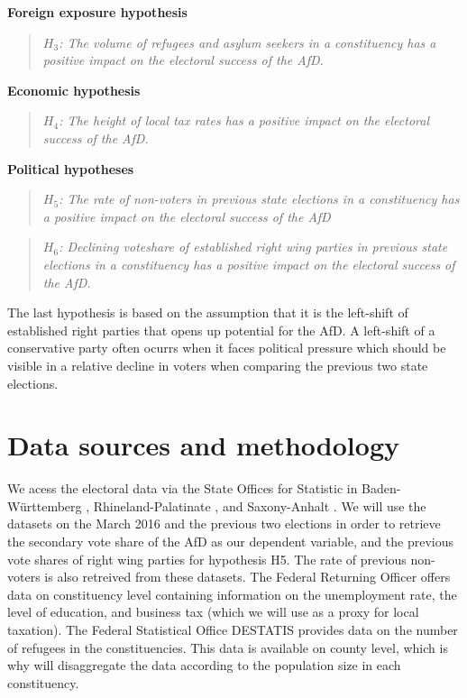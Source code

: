 \documentclass[12pt, hidelinks]{article}
\begin{document}
\textbf{Foreign exposure hypothesis}

\begin{quote}
    \textit{$H_{3}$: The volume of refugees and asylum seekers in a constituency has a positive impact on the electoral success of the AfD.}
\end{quote}


\textbf{Economic hypothesis}
\begin{quote}
    \textit{$H_{4}$: The height of local tax rates has a positive impact on the electoral success of the AfD.}
\end{quote}

\textbf{Political hypotheses}
\begin{quote}
    \textit{$H_{5}$: The rate of non-voters in previous state elections in a constituency has a positive impact on the electoral success of the AfD}
\end{quote}

\begin{quote}
    \textit{$H_{6}$: Declining voteshare of established right wing parties in previous state elections in a constituency has a positive impact on the electoral success of the AfD.}
\end{quote}


The last hypothesis is based on the assumption that it is the left-shift of established right parties that opens up potential for the AfD. A left-shift of a conservative party often ocurrs when it faces political pressure which should be visible in a relative decline in voters when comparing the previous two state elections.

\section{Data sources and methodology}

We acess the electoral data via the State Offices for Statistic in Baden-Württemberg \cite{BWStateOffice}, Rhineland-Palatinate \cite{RPStateOffice}, and Saxony-Anhalt \cite{SAStateOffice}. We will use the datasets on the March 2016 and the previous two elections in order to retrieve the secondary vote share of the AfD as our dependent variable, and the previous vote shares of right wing parties for hypothesis H5. The rate of previous non-voters is also retreived from these datasets.
The Federal Returning Officer \cite{Bwldata} offers data on constituency level containing information on the unemployment rate, the level of education, and business tax (which we will use as a proxy for local taxation).
The Federal Statistical Office DESTATIS \cite{DESTATIS} provides data on the number of refugees in the constituencies. This data is available on county level, which is why will disaggregate the data according to the population size in each constituency.
\end{document}
